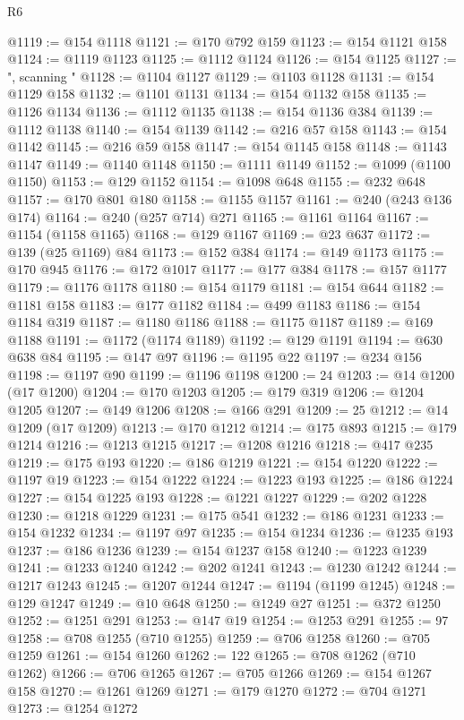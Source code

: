 \begin{lexlean}{R6}
\begin{coremodule}
{{{{{{{{{{{{{{{{{{{{{{{{{{{{{{{{{{{{{{{{{{{{{{{{{{{{{{{{{{{{{{{{{{{{{{{{@1119 := @154 @1118
@1121 := @170 @792 @159
@1123 := @154 @1121 @158
@1124 := @1119 @1123
@1125 := @1112 @1124
@1126 := @154 @1125
@1127 := ", scanning "
@1128 := @1104 @1127
@1129 := @1103 @1128
@1131 := @154 @1129 @158
@1132 := @1101 @1131
@1134 := @154 @1132 @158
@1135 := @1126 @1134
@1136 := @1112 @1135
@1138 := @154 @1136 @384
@1139 := @1112 @1138
@1140 := @154 @1139
@1142 := @216 @57 @158
@1143 := @154 @1142
@1145 := @216 @59 @158
@1147 := @154 @1145 @158
@1148 := @1143 @1147
@1149 := @1140 @1148
@1150 := @1111 @1149
@1152 := @1099 (@1100 @1150)
@1153 := @129 @1152
@1154 := @1098 @648
@1155 := @232 @648
@1157 := @170 @801 @180
@1158 := @1155 @1157
@1161 := @240 (@243 @136 @174)
@1164 := @240 (@257 @714) @271
@1165 := @1161 @1164
@1167 := @1154 (@1158 @1165)
@1168 := @129 @1167
@1169 := @23 @637
@1172 := @139 (@25 @1169) @84
@1173 := @152 @384
@1174 := @149 @1173
@1175 := @170 @945
@1176 := @172 @1017
@1177 := @177 @384
@1178 := @157 @1177
@1179 := @1176 @1178
@1180 := @154 @1179
@1181 := @154 @644
@1182 := @1181 @158
@1183 := @177 @1182
@1184 := @499 @1183
@1186 := @154 @1184 @319
@1187 := @1180 @1186
@1188 := @1175 @1187
@1189 := @169 @1188
@1191 := @1172 (@1174 @1189)
@1192 := @129 @1191
@1194 := @630 @638 @84
@1195 := @147 @97
@1196 := @1195 @22
@1197 := @234 @156
@1198 := @1197 @90
@1199 := @1196 @1198
@1200 := 24
@1203 := @14 @1200 (@17 @1200)
@1204 := @170 @1203
@1205 := @179 @319
@1206 := @1204 @1205
@1207 := @149 @1206
@1208 := @166 @291
@1209 := 25
@1212 := @14 @1209 (@17 @1209)
@1213 := @170 @1212
@1214 := @175 @893
@1215 := @179 @1214
@1216 := @1213 @1215
@1217 := @1208 @1216
@1218 := @417 @235
@1219 := @175 @193
@1220 := @186 @1219
@1221 := @154 @1220
@1222 := @1197 @19
@1223 := @154 @1222
@1224 := @1223 @193
@1225 := @186 @1224
@1227 := @154 @1225 @193
@1228 := @1221 @1227
@1229 := @202 @1228
@1230 := @1218 @1229
@1231 := @175 @541
@1232 := @186 @1231
@1233 := @154 @1232
@1234 := @1197 @97
@1235 := @154 @1234
@1236 := @1235 @193
@1237 := @186 @1236
@1239 := @154 @1237 @158
@1240 := @1223 @1239
@1241 := @1233 @1240
@1242 := @202 @1241
@1243 := @1230 @1242
@1244 := @1217 @1243
@1245 := @1207 @1244
@1247 := @1194 (@1199 @1245)
@1248 := @129 @1247
@1249 := @10 @648
@1250 := @1249 @27
@1251 := @372 @1250
@1252 := @1251 @291
@1253 := @147 @19
@1254 := @1253 @291
@1255 := 97
@1258 := @708 @1255 (@710 @1255)
@1259 := @706 @1258
@1260 := @705 @1259
@1261 := @154 @1260
@1262 := 122
@1265 := @708 @1262 (@710 @1262)
@1266 := @706 @1265
@1267 := @705 @1266
@1269 := @154 @1267 @158
@1270 := @1261 @1269
@1271 := @179 @1270
@1272 := @704 @1271
@1273 := @1254 @1272
}}}}}}}}}}}}}}}}}}}}}}}}}}}}}}}}}}}}}}}}}}}}}}}}}}}}}}}}}}}}}}}}}}}}}}}}
\end{coremodule}
\end{lexlean}

